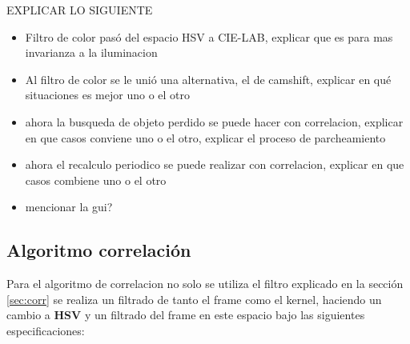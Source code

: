 \begin{itemize}
EXPLICAR LO SIGUIENTE
\begin{itemize}
\item Filtro de color pasó del espacio HSV a CIE-LAB, explicar que es para mas invarianza a la iluminacion
\item Al filtro de color se le unió una alternativa, el de camshift, explicar en qué situaciones es mejor uno o el otro
\item ahora la busqueda de objeto perdido se puede hacer con correlacion, explicar en que casos conviene uno o el otro, explicar el proceso de parcheamiento
\item ahora el recalculo periodico se puede realizar con correlacion, explicar en que casos combiene uno o el otro
\item mencionar la gui?
\end{itemize}

\subsection{Algoritmo correlación}
Para el algoritmo de correlacion no solo se utiliza el filtro explicado en la sección \ref{sec:corr} se realiza un filtrado de tanto el frame como el kernel, haciendo un cambio a \textbf{HSV} y un filtrado del frame en este espacio bajo las siguientes especificaciones: 
            

\end{itemize}
